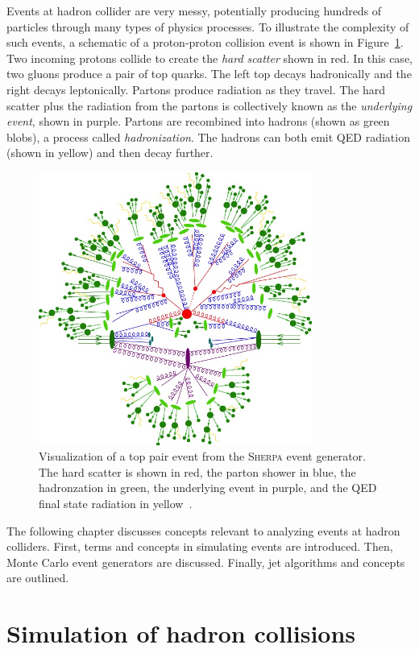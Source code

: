 Events at hadron collider are very messy, potentially producing hundreds of particles through many types of physics processes. To illustrate the complexity of such events, a schematic of a proton-proton collision event is shown in Figure~\ref{fig:event}. Two incoming protons collide to create the \emph{hard scatter} shown in red. In this case, two gluons produce a pair of top quarks. The left top decays hadronically and the right decays leptonically. Partons produce radiation as they travel. The hard scatter plus the radiation from the partons is collectively known as the \emph{underlying event}, shown in purple.  Partons are recombined into hadrons (shown as green blobs), a process called \emph{hadronization}. The hadrons can both emit QED radiation (shown in yellow) and then decay further.
\begin{figure}
\centering
\includegraphics[width=0.8\textwidth]{fig/thry/qcdevent}
\caption{Visualization of a top pair event from the \textsc{Sherpa} event generator. The hard scatter is shown in red, the parton shower in blue, the hadronzation in green, the underlying event in purple, and the QED final state radiation in yellow~\cite{sherpaevent}.}
\label{fig:event}
\end{figure}
The following chapter discusses concepts relevant to analyzing events at hadron colliders. First, terms and concepts in simulating events are introduced. Then, Monte Carlo event generators are discussed. Finally, jet algorithms and concepts are outlined.
\section{Simulation of hadron collisions}

